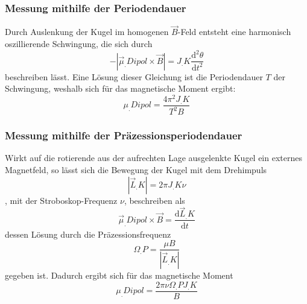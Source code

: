 \subsubsection{Messung mithilfe der Periodendauer}
Durch Auslenkung der Kugel im homogenen $\vec{B}$-Feld entsteht eine harmonisch oszillierende Schwingung, die sich durch
\[-|\vec{\mu}_.{Dipol}\times\vec{B}| = J_.K \frac{\mathrm{d}^2\theta}{\mathrm{d}t^2}\]
beschreiben lässt\cite{V105}.\newline
Eine Lösung dieser Gleichung ist die Periodendauer $T$ der Schwingung,
weshalb sich für das magnetische Moment ergibt:
\begin{equation}
\mu_.{Dipol} = \frac{4\pi^2J_.K}{T^2B}\label{eq:mu2}
\end{equation}

\subsubsection{Messung mithilfe der Präzessionsperiodendauer}
Wirkt auf die rotierende aus der aufrechten Lage ausgelenkte Kugel ein externes Magnetfeld, so lässt sich die Bewegung der Kugel mit dem Drehimpuls 
\begin{equation}|\vec{L}_.K| = 2\pi J_.K \nu\label{eq:L}
\end{equation}, mit der Stroboskop-Frequenz $\nu$,
beschreiben als
\[\vec{\mu}_.{Dipol}\times\vec{B} = \frac{\mathrm{d}\vec{L}_.K}{\mathrm{d}t}\]
dessen Lösung durch die Präzessionsfrequenz
\[\Omega_.P = \frac{\mu B}{|\vec{L}_.K|}\]
gegeben ist\cite{V105}.
Dadurch ergibt sich für das magnetische Moment
\begin{equation}
\mu_.{Dipol} = \frac{2\pi\nu\Omega_.PJ_.K}{B}\label{eq:mu3}
\end{equation}